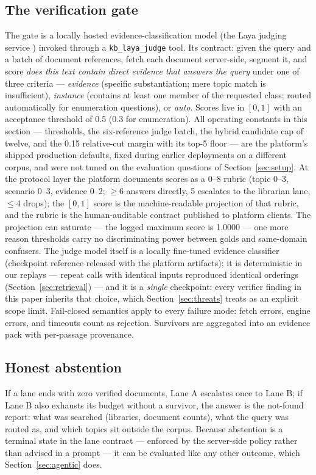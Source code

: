 \subsection{The verification gate}
\label{sec:gate}
The gate is a locally hosted evidence-classification model (the Laya
judging service \cite{laya}) invoked through a
\texttt{kb\_laya\_judge} tool. Its contract: given the
query and a batch of document references, fetch each document server-side,
segment it, and score \emph{does this text contain direct evidence that
answers the query} under one of three criteria --- \emph{evidence}
(specific substantiation; mere topic match is insufficient),
\emph{instance} (contains at least one member of the requested class;
routed automatically for enumeration questions), or \emph{auto}. Scores
live in $[0,1]$ with an acceptance threshold of 0.5 (0.3 for enumeration).
All operating constants in this section --- thresholds, the six-reference
judge batch, the hybrid candidate cap of twelve, and the 0.15 relative-cut
margin with its top-5 floor --- are the platform's shipped production
defaults, fixed during earlier deployments on a different corpus, and were
not tuned on the evaluation questions of Section~\ref{sec:setup}. At the
protocol layer the platform documents scores as a 0--8 rubric (topic 0--3,
scenario 0--3, evidence 0--2; $\geq$6 answers directly, 5 escalates to the
librarian lane, $\leq$4 drops); the $[0,1]$ score is the machine-readable
projection of that rubric, and the rubric is the human-auditable contract
published to platform clients. The projection can saturate --- the logged
maximum score is 1.0000 --- one more reason thresholds carry no
discriminating power between golds and same-domain confusers. The judge
model itself is a locally
fine-tuned evidence classifier (checkpoint reference released with the
platform artifacts); it is deterministic in our replays --- repeat calls
with identical inputs reproduced identical orderings
(Section~\ref{sec:retrieval}) --- and it is a \emph{single} checkpoint:
every verifier finding in this paper inherits that choice, which
Section~\ref{sec:threats} treats as an explicit scope limit.
Fail-closed semantics apply to every
failure mode: fetch errors, engine errors, and timeouts count as
rejection. Survivors are aggregated into an evidence pack with
per-passage provenance.

\subsection{Honest abstention}
If a lane ends with zero verified documents, Lane A escalates once to Lane
B; if Lane B also exhausts its budget without a survivor, the answer is the
not-found report: what was searched (libraries, document counts), what the
query was routed as, and which topics sit outside the corpus. Because
abstention is a terminal state in the lane contract --- enforced by the
server-side policy rather than advised in a prompt --- it can be evaluated
like any other outcome, which Section~\ref{sec:agentic} does.

